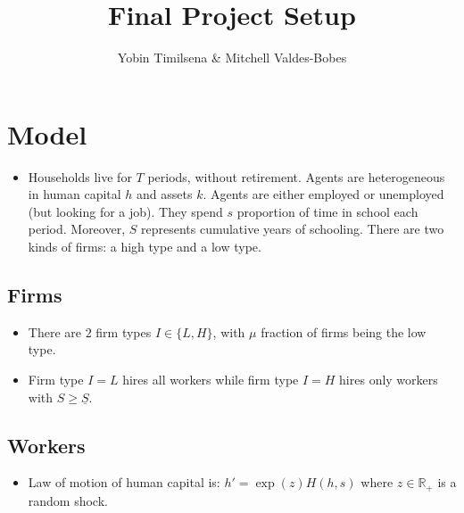  
\usepackage{amsmath}
\usepackage{amsthm}
\usepackage{amssymb}


\title{Final Project Setup}
\author{Yobin Timilsena \& Mitchell Valdes-Bobes}
\maketitle



\section{Model}
\begin{itemize}
	\item Households live for $ T $ periods, without retirement. Agents are heterogeneous in human capital $ h $ and assets $ k $. Agents are either employed or unemployed (but looking for a job). They spend $ s $ proportion of time in school each period.  Moreover, $ S $ represents cumulative years of schooling.
	There are two kinds of firms: a high type and a low type.
\end{itemize}

\subsection{Firms}
\begin{itemize}
    \item There are $2$ firm types $I \in \{L,H\}$, with $ \mu $ fraction of firms being the low type.
    \item Firm type $I=L$ hires all workers while firm type $I=H$ hires only workers with $S \geq \underline{S}$.
\end{itemize}

\subsection{Workers}
\begin{itemize}
    \item Law of motion of human capital is: $h' = \exp(z) H(h,s)$ where $z \in \mathbb{R}_+$ is a random shock. 
\end{itemize}
